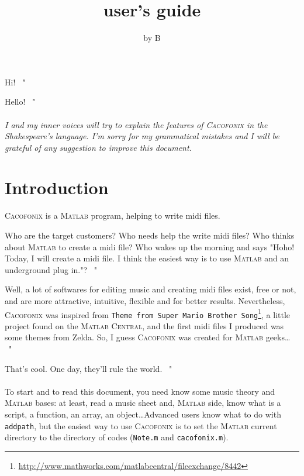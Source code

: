 \documentclass{article}
\title{\cacofonix user's guide}
\author{by B}
\date{}
\newcommand\cacofonix{\textsc{Cacofonix}\xspace}
\newcommand\matlab{\textsc{Matlab}\xspace}
\newcommand\noteFile{\texttt{Note.m}\xspace}
\newcommand\cacofonixFile{\texttt{cacofonix.m}\xspace}
\newcommand\exchange[2]{\texttt{#1}\footnote{\url{#2}}\xspace}
\newenvironment{meenv}{ \par \noindent \makebox[6em][r]{ \textcolor{mecolor}{Me}: " --~}}{~"}
\newenvironment{myselfenv}{ \par \noindent \makebox[6em][r]{ \textcolor{myselfcolor}{Myself}: " --~}}{~"}
\newcommand{ \me }[1]{%
\begin{meenv}%
	#1%
\end{meenv} }
\newcommand{ \myself }[1]{%
\begin{myselfenv}%
	#1%
\end{myselfenv} }
\begin{document}
\maketitle

\me{ Hi! }
\myself{ Hello! }

\paragraph{}

\emph{I and my inner voices will try to explain the features of \cacofonix in the Shakespeare's language. I'm sorry for my grammatical mistakes and I will be grateful of any suggestion to improve this document.}

\tableofcontents

\section{Introduction}

\cacofonix is a \matlab program, helping to write midi files.

\me{ Who are the target customers? Who needs help the write midi files? Who thinks about \matlab to create a midi file? Who wakes up the morning and says "Hoho! Today, I will create a midi file. I think the easiest way is to use \matlab and an underground plug in."? }
\myself{ Well, a lot of softwares for editing music and creating midi files exist, free or not, and are more attractive, intuitive, flexible and for better results. Nevertheless, \cacofonix was inspired from \exchange{Theme from Super Mario Brother Song}{http://www.mathworks.com/matlabcentral/fileexchange/8442}, a little project found on the \textsc{Matlab Central}, and the first midi files I produced was some themes from Zelda. So, I guess \cacofonix was created for \matlab geeks\dots }
\me{ That's cool. One day, they'll rule the world. }

\paragraph{}

To start and to read this document, you need know some music theory and \matlab bases: at least, read a music sheet and, \matlab side, know what is a script, a function, an array, an object\dots Advanced users know what to do with \lstinline!addpath!, but the easiest way to use \cacofonix is to set the \matlab current directory to the directory of codes (\noteFile and \cacofonixFile).
\end{document}
